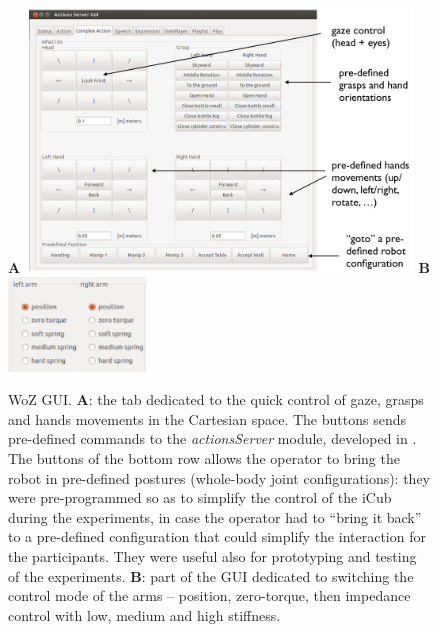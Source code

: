 \begin{figure}
\centering
{\large \textbf{\textsf{A}}} \includegraphics[height=7cm]{Serena/figures/gui_actions.jpg} \hspace{0.5cm}
{\large \textbf{\textsf{B}}} \includegraphics[height=2.5cm]{Serena/figures/gui_demoforcecontrol.jpg}
\caption{WoZ GUI. \textbf{\textsf{A}}: the tab dedicated to the quick control of gaze, grasps and hands movements in the Cartesian space. The buttons sends pre-defined commands to the \textit{actionsServer} module, developed in \cite{Ivaldi2014tamd}. The buttons of the bottom row allows the operator to bring the robot in pre-defined postures (whole-body joint configurations): they were pre-programmed so as to simplify the control of the iCub during the experiments, in case the operator had to ``bring it back'' to a pre-defined configuration that could simplify the interaction for the participants. They were useful also for prototyping and testing of the experiments. \textbf{\textsf{B}}: part of the GUI dedicated to switching the control mode of the arms -- position, zero-torque, then impedance control with low, medium and high stiffness.}
\label{fig:guiactions}
\end{figure}


